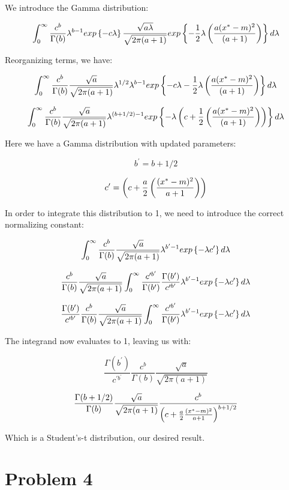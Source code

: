 \documentclass[twoside,11pt]{homework}
\begin{document}
We introduce the Gamma distribution:

\[
\int_{0}^{\infty}
\frac{c^b}{\Gamma(b)}
\lambda^{b-1}
exp\left\{
-c\lambda
\right\}
\frac{\sqrt{a\lambda}}{\sqrt{2\pi(a+1)}}
exp\left\{
- \frac{1}{2}\lambda
\left(
\frac{a(x^* - m)^2}{(a + 1)}
\right)
\right\}d\lambda
\]

Reorganizing terms, we have:

\[
\int_{0}^{\infty}
\frac{c^b}{\Gamma(b)}
\frac{\sqrt{a}}{\sqrt{2\pi(a+1)}}
\lambda^{1/2}
\lambda^{b-1}
exp\left\{
-c\lambda
- \frac{1}{2}\lambda
\left(
\frac{a(x^* - m)^2}{(a + 1)}
\right)
\right\}d\lambda
\]

\[
\int_{0}^{\infty}
\frac{c^b}{\Gamma(b)}
\frac{\sqrt{a}}{\sqrt{2\pi(a+1)}}
\lambda^{(b+1/2)-1}
exp\left\{
-\lambda
\left(
c
+ \frac{1}{2}
\left(
\frac{a(x^* - m)^2}{(a + 1)}
\right)
\right)
\right\}d\lambda
\]

Here we have a Gamma distribution with updated parameters:

\[
b^\prime = b + 1/2
\]

\[
c^\prime =  \left(
c + \frac{a}{2}
\left(
\frac{(x^* - m)^2}{a + 1}
\right)
\right)
\]

In order to integrate this distribution to 1, we need to introduce the correct normalizing constant:

\[
\int_{0}^{\infty}
\frac{c^b}{\Gamma(b)}
\frac{\sqrt{a}}{\sqrt{2\pi(a+1)}}
\lambda^{b^\prime-1}
exp\left\{
-\lambda c^\prime
\right\}d\lambda
\]

\[
\frac{c^b}{\Gamma(b)}
\frac{\sqrt{a}}{\sqrt{2\pi(a+1)}}
\int_{0}^{\infty}
\frac{c^{\prime b^\prime}}{\Gamma(b^\prime)}
\frac{\Gamma(b^\prime)}{c^{\prime b^\prime}}
\lambda^{b^\prime-1}
exp\left\{
-\lambda c^\prime
\right\}d\lambda
\]

\[
\frac{\Gamma(b^\prime)}{c^{\prime b^\prime}}
\frac{c^b}{\Gamma(b)}
\frac{\sqrt{a}}{\sqrt{2\pi(a+1)}}
\int_{0}^{\infty}
\frac{c^{\prime b^\prime}}{\Gamma(b^\prime)}
\lambda^{b^\prime-1}
exp\left\{
-\lambda c^\prime
\right\}d\lambda
\]

The integrand now evaluates to 1, leaving us with:

\[
\frac{\Gamma(b^\prime)}{c^{\prime b^\prime}}
\frac{c^b}{\Gamma(b)}
\frac{\sqrt{a}}{\sqrt{2\pi(a+1)}}
\]

\[
\frac{\Gamma(b + 1/2)}{\Gamma(b)}
\frac{\sqrt{a}}{\sqrt{2\pi(a+1)}}
\frac{c^b}{
\left(c + \frac{a}{2}
\frac{(x^* - m)^2}{a + 1}\right)^{b + 1/2}}
\]

Which is a Student's-t distribution, our desired result.

\section*{Problem 4}
\end{document}
